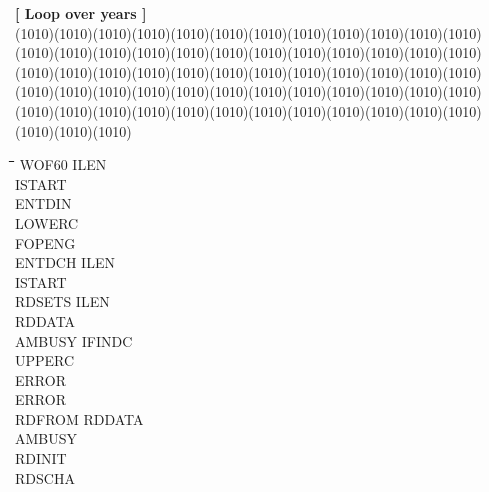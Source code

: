 \bigskip
\strut\hfill {\bf [ Loop over years ]}\\
 \GrBox(1010)\GrBox(1010)\GrBox(1010)\GrBox(1010)\GrBox(1010)\GrBox(1010)\GrBox(1010)\GrBox(1010)\GrBox(1010)\GrBox(1010)\GrBox(1010)\GrBox(1010)\GrBox(1010)\GrBox(1010)\GrBox(1010)\GrBox(1010)\GrBox(1010)\GrBox(1010)\GrBox(1010)\GrBox(1010)\GrBox(1010)\GrBox(1010)\GrBox(1010)\GrBox(1010)\GrBox(1010)\GrBox(1010)\GrBox(1010)\GrBox(1010)\GrBox(1010)\GrBox(1010)\GrBox(1010)\GrBox(1010)\GrBox(1010)\GrBox(1010)\GrBox(1010)\GrBox(1010)\GrBox(1010)\GrBox(1010)\GrBox(1010)\GrBox(1010)\GrBox(1010)\GrBox(1010)\GrBox(1010)\GrBox(1010)\GrBox(1010)\GrBox(1010)\GrBox(1010)\GrBox(1010)\GrBox(1010)\GrBox(1010)\GrBox(1010)\GrBox(1010)\GrBox(1010)\GrBox(1010)\GrBox(1010)\GrBox(1010)\GrBox(1010)\GrBox(1010)\GrBox(1010)\GrBox(1010)\GrBox(1010)\GrBox(1010)\GrBox(1010)\nwln
\begin{tabbing}
\hspace{1.27cm}\=\hspace{1.27cm}\=\hspace{1.27cm}\=\hspace{1.27cm}\=%
\hspace{1.27cm}\=\hspace{1.27cm}\=\hspace{1.27cm}\=\hspace{1.27cm}\=%
\hspace{1.27cm}\=\hspace{1.27cm}\=\kill
\>\> WOF60\> \> ILEN\\
\>\> \> \> ISTART\\
\>\> \> \> ENTDIN\\
\>\> \> \> LOWERC\\
\>\> \> \> FOPENG\\
\>\> \> \> ENTDCH\> \> ILEN\\
\>\> \> \> \> \> ISTART\\
\>\> \> \> RDSETS\> \> ILEN\\
\>\> \> \> \> \> RDDATA\\
\>\> \> \> \> \> AMBUSY\> \> IFINDC\\
\>\> \> \> \> \> \> \> UPPERC\\
\>\> \> \> \> \> \> \> ERROR\\
\>\> \> \> ERROR\\
\>\> \> \> RDFROM\> \> RDDATA\\
\>\> \> \> \> \> AMBUSY\\
\>\> \> \> RDINIT\\
\>\> \> \> RDSCHA\\

\end{tabbing}
